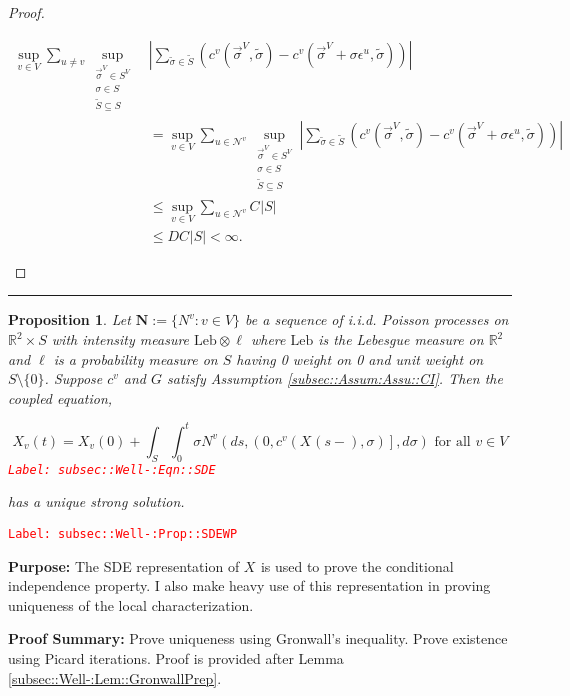 \documentclass[12pt]{article}
\newcommand{\mb}{\mathbb}
\newcommand{\mc}{\mathcal}
\newcommand{\te}{\text}
\newcommand{\ep}{\epsilon}
\newcommand{\tr}{\textcolor{red}}
\newcommand{\labe}[1]{\tr{\texttt{Label: #1}}}
\newcommand{\purpose}{\textbf{Purpose: }}
\newcommand{\pfsum}{\textbf{Proof Summary: }}
\newcommand{\lin}{\rule{\linewidth}{0.4 pt}}
\newcommand{\defeq}{:=}								%
\renewcommand{\v}{v}							%
\newcommand{\vv}{u}								%
\renewcommand{\S}{S}							%
\newcommand{\s}{\sigma}							%
\newcommand{\sv}{\vec{\s}}						%
\newcommand{\ev}{\ep}							%
\renewcommand{\t}{t}							%
\renewcommand{\tt}{s}							%
\newcommand{\X}{X}								%
\newcommand{\IGr}{c}							%
\newcommand{\neigh}{\mc{N}}						%
\newcommand{\vind}[1]{^{#1}}					%
\newcommand{\carp}[1]{^{#1}}					%
\newcommand{\vsi}[1]{^{#1}}						%
\newcommand{\cind}[1]{_{#1}}					%
\newcommand{\tp}[1]{(#1)}						%
\newcommand{\tip}[1]{#1}						%
\newcommand{\const}{C}							%
\newcommand{\degr}{D}							%
\renewcommand{\ss}{\tilde{\s}}					%
\renewcommand{\SS}{\tilde{\S}}					%
\newcommand{\poisses}{\mathbf{N}}				%
\newcommand{\poiss}{N}							%
\newcommand{\leb}{\te{Leb}}						%
\newcommand{\Sm}{\ell}							%
\newcommand{\indx}[1]{_{#1}}					%
\newtheorem{prop}[thms]{Proposition}
\begin{document}
\begin{proof}
\begin{enumerate}[i)]
\begin{align*}
\sup_{\v\in V}\sum_{\vv \neq \v} \sup_{\substack{\sv\cind{}\vsi{V} \in \S\carp{V}\\ \s\in \S\\ \SS\subseteq \S}}& \left|\sum_{\ss \in \SS} (\IGr\vind{\v}(\sv\cind{}\vsi{V},\ss) - \IGr\vind{\v}(\sv\cind{}\vsi{V}+\s\ev\vind{\vv},\ss))\right|\\
&  = \sup_{\v\in V}\sum_{\vv\in \neigh\vind{\v}} \sup_{\substack{\sv\cind{}\vsi{V} \in \S\carp{V}\\ \s\in \S\\ \SS\subseteq \S}} \left|\sum_{\ss \in \SS} (\IGr\vind{\v}(\sv\cind{}\vsi{V},\ss) - \IGr\vind{\v}(\sv\cind{}\vsi{V}+\s\ev\vind{\vv},\ss))\right|\\
&\leq \sup_{\v\in V} \sum_{\vv \in \neigh\vind{\v}} \const\indx{}|\S|\\
&\leq \degr \const\indx{}|\S| < \infty.
\end{align*}


\end{enumerate}
\end{proof}

\lin

\begin{prop}
Let \(\poisses \defeq \{\poiss\vind{\v}:\v\in V\}\) be a sequence of i.i.d. Poisson processes on \(\mb{R}^2\times \S\) with intensity measure \(\leb\otimes \Sm\) where \(\leb\) is the Lebesgue measure on \(\mb{R}^2\) and \(\Sm\) is a probability measure on \(\S\) having 0 weight on 0 and unit weight on \(\S\setminus \{0\}\). Suppose \(\IGr\vind{\v}\) and \(G\) satisfy Assumption \ref{subsec::Assum:Assu::CI}. Then the coupled equation,

\begin{equation}
\X\cind{\v}\tp{\t} = \X\cind{\v}\tp{0} + \int_\S\int_0^\t \s\poiss\vind{\v}\left(d\tt,\left(0,\IGr\vind{\v}(\X\cind{}\tp{\tt-},\s)\right],d\s\right) \te{ for all }\v \in V
\label{subsec::Well-:Eqn::SDE}
\end{equation}
\labe{subsec::Well-:Eqn::SDE}

has a unique strong solution.
\label{subsec::Well-:Prop::SDEWP}
\end{prop}
\labe{subsec::Well-:Prop::SDEWP}

\purpose The SDE representation of \(\X\cind{}\tip{}\) is used to prove the conditional independence property. I also make heavy use of this representation in proving uniqueness of the local characterization.

\pfsum Prove uniqueness using Gronwall's inequality. Prove existence using Picard iterations. Proof is provided after Lemma \ref{subsec::Well-:Lem::GronwallPrep}.
\end{document}
